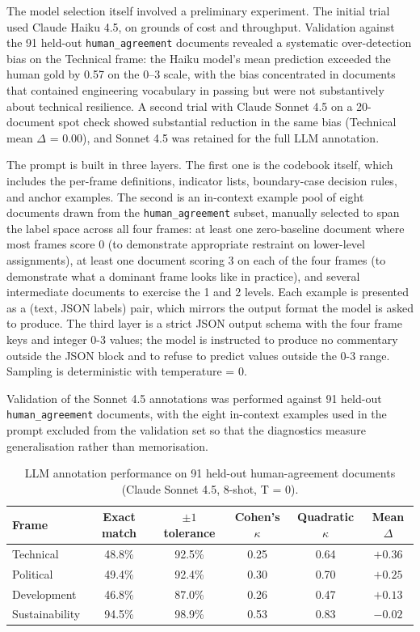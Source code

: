 \documentclass[12pt, journal]{IEEEtran}
\begin{document}
The model selection itself involved a preliminary experiment. The initial trial used Claude Haiku 4.5, on grounds of cost and throughput. Validation against the 91 held-out \texttt{human\_agreement} documents revealed a systematic over-detection bias on the Technical frame: the Haiku model's mean prediction exceeded the human gold by 0.57 on the 0--3 scale, with the bias concentrated in documents that contained engineering vocabulary in passing but were not substantively about technical resilience. A second trial with Claude Sonnet 4.5 on a 20-document spot check showed substantial reduction in the same bias (Technical mean $\Delta$ = 0.00), and Sonnet 4.5 was retained for the full LLM annotation.

The prompt is built in three layers. The first one is the codebook itself, which includes the per-frame definitions, indicator lists, boundary-case decision rules, and anchor examples. The second is an in-context example pool of eight documents drawn from the \texttt{human\_agreement} subset, manually selected to span the label space across all four frames: at least one zero-baseline document where most frames score 0 (to demonstrate appropriate restraint on lower-level assignments), at least one document scoring 3 on each of the four frames (to demonstrate what a dominant frame looks like in practice), and several intermediate documents to exercise the 1 and 2 levels. Each example is presented as a (text, JSON labels) pair, which mirrors the output format the model is asked to produce. The third layer is a strict JSON output schema with the four frame keys and integer 0-3 values; the model is instructed to produce no commentary outside the JSON block and to refuse to predict values outside the 0-3 range. Sampling is deterministic with temperature = 0.

Validation of the Sonnet 4.5 annotations was performed against 91 held-out \texttt{human\_agreement} documents, with the eight in-context examples used in the prompt excluded from the validation set so that the diagnostics measure generalisation rather than memorisation.

\begin{table}[!ht]
\renewcommand{\arraystretch}{1.3}
\caption{LLM annotation performance on 91 held-out human-agreement documents (Claude Sonnet 4.5, 8-shot, T = 0).}
\label{table_llm}
\centering
\begin{tabular}{|l|c|c|c|c|c|}
\hline
\textbf{Frame} & \textbf{Exact match} & \textbf{$\pm 1$ tolerance} & \textbf{Cohen's $\kappa$} & \textbf{Quadratic $\kappa$} & \textbf{Mean $\Delta$} \\
\hline\hline
Technical & 48.8\% & 92.5\% & 0.25 & 0.64 & $+0.36$ \\
\hline
Political & 49.4\% & 92.4\% & 0.30 & 0.70 & $+0.25$ \\
\hline
Development & 46.8\% & 87.0\% & 0.26 & 0.47 & $+0.13$ \\
\hline
Sustainability & 94.5\% & 98.9\% & 0.53 & 0.83 & $-0.02$ \\
\hline
\end{tabular}
\end{table}
\end{document}
